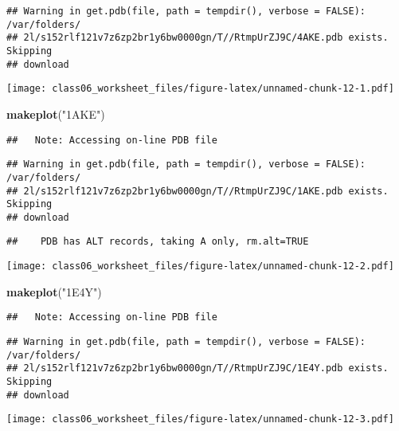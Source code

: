 \documentclass[]{article}
\newenvironment{Shaded}{\begin{snugshade}}{\end{snugshade}}
\newcommand{\KeywordTok}[1]{\textcolor[rgb]{0.13,0.29,0.53}{\textbf{#1}}}
\newcommand{\StringTok}[1]{\textcolor[rgb]{0.31,0.60,0.02}{#1}}
\newcommand{\NormalTok}[1]{#1}
\begin{document}
\begin{verbatim}
## Warning in get.pdb(file, path = tempdir(), verbose = FALSE): /var/folders/
## 2l/s152rlf121v7z6zp2br1y6bw0000gn/T//RtmpUrZJ9C/4AKE.pdb exists. Skipping
## download
\end{verbatim}

\texttt{[image: class06\_worksheet\_files/figure-latex/unnamed-chunk-12-1.pdf]}

\begin{Shaded}
\begin{Highlighting}[]
\KeywordTok{makeplot}\NormalTok{(}\StringTok{"1AKE"}\NormalTok{)}
\end{Highlighting}
\end{Shaded}

\begin{verbatim}
##   Note: Accessing on-line PDB file
\end{verbatim}

\begin{verbatim}
## Warning in get.pdb(file, path = tempdir(), verbose = FALSE): /var/folders/
## 2l/s152rlf121v7z6zp2br1y6bw0000gn/T//RtmpUrZJ9C/1AKE.pdb exists. Skipping
## download
\end{verbatim}

\begin{verbatim}
##    PDB has ALT records, taking A only, rm.alt=TRUE
\end{verbatim}

\texttt{[image: class06\_worksheet\_files/figure-latex/unnamed-chunk-12-2.pdf]}

\begin{Shaded}
\begin{Highlighting}[]
\KeywordTok{makeplot}\NormalTok{(}\StringTok{"1E4Y"}\NormalTok{)}
\end{Highlighting}
\end{Shaded}

\begin{verbatim}
##   Note: Accessing on-line PDB file
\end{verbatim}

\begin{verbatim}
## Warning in get.pdb(file, path = tempdir(), verbose = FALSE): /var/folders/
## 2l/s152rlf121v7z6zp2br1y6bw0000gn/T//RtmpUrZJ9C/1E4Y.pdb exists. Skipping
## download
\end{verbatim}

\texttt{[image: class06\_worksheet\_files/figure-latex/unnamed-chunk-12-3.pdf]}
\end{document}
